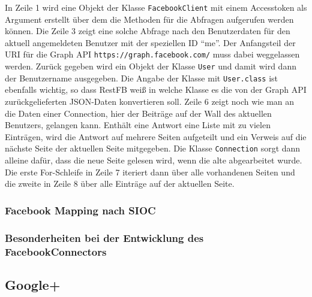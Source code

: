 In Zeile 1 wird eine Objekt der Klasse \texttt{FacebookClient} mit einem Accesstoken als Argument erstellt über dem die Methoden für die Abfragen aufgerufen werden können. Die Zeile 3 zeigt eine solche Abfrage nach den Benutzerdaten für den aktuell angemeldeten Benutzer mit der speziellen ID \enquote{me}. Der Anfangsteil der URI für die Graph API \texttt{https://graph.facebook.com/} muss dabei weggelassen werden. Zurück gegeben wird ein Objekt der Klasse \texttt{User} und damit wird dann der Benutzername ausgegeben. Die Angabe der Klasse mit \texttt{User.class} ist ebenfalls wichtig, so dass RestFB weiß in welche Klasse es die von der Graph API zurückgelieferten JSON-Daten konvertieren soll. Zeile 6 zeigt noch wie man an die Daten einer Connection, hier der Beiträge auf der Wall des aktuellen Benutzers, gelangen kann. Enthält eine Antwort eine Liste mit zu vielen Einträgen, wird die Antwort auf mehrere Seiten aufgeteilt und ein Verweis auf die nächste Seite der aktuellen Seite mitgegeben. Die Klasse \texttt{Connection} sorgt dann alleine dafür, dass die neue Seite gelesen wird, wenn die alte abgearbeitet wurde. Die erste For-Schleife in Zeile 7 iteriert dann über alle vorhandenen Seiten und die zweite in Zeile 8 über alle Einträge auf der aktuellen Seite.


\subsubsection{Facebook Mapping nach SIOC} %
\label{ssub:facebook_mapping_nach_sioc}


\subsubsection{Besonderheiten bei der Entwicklung des FacebookConnectors} %
\label{ssub:besonderheiten_bei_der_entwicklung_des_facebookconnectors}





\subsection{Google+} %
\label{sub:google_plus_connector}

